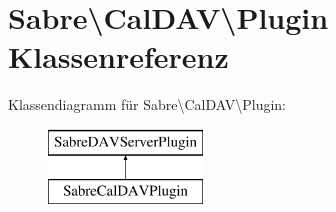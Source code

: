 \hypertarget{class_sabre_1_1_cal_d_a_v_1_1_plugin}{}\section{Sabre\textbackslash{}Cal\+D\+AV\textbackslash{}Plugin Klassenreferenz}
\label{class_sabre_1_1_cal_d_a_v_1_1_plugin}
Klassendiagramm für Sabre\textbackslash{}Cal\+D\+AV\textbackslash{}Plugin\+:\begin{figure}[H]
\begin{center}
\leavevmode
\includegraphics[height=2.000000cm]{class_sabre_1_1_cal_d_a_v_1_1_plugin}
\end{center}
\end{figure}
